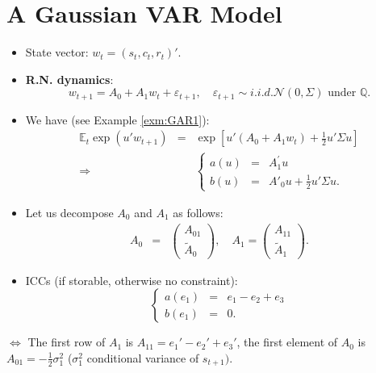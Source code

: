 \documentclass[
  12pt,
]{book}
\theoremstyle{definition}
\theoremstyle{definition}
\theoremstyle{definition}
\theoremstyle{definition}
\theoremstyle{remark}
\begin{document}
\hypertarget{FCFPGaussian}{%
\section{A Gaussian VAR Model}\label{FCFPGaussian}}

\begin{itemize}
\item
  State vector: \(w_t = (s_t, c_t, r_t)'\).
\item
  \textbf{R.N. dynamics}:
  \[
  w_{t+1} = A_0 + A_1 w_t + \varepsilon_{t+1}, \quad \varepsilon_{t+1} \sim  i.i.d. \mathcal{N}(0,\Sigma) \mbox{ under }\mathbb{Q}.
  \]
\item
  We have (see Example \ref{exm:GAR1}):
  \begin{eqnarray*}
  \mathbb{E}_t \exp (u' w_{t+1}) &=& \exp \left[u' (A_0 + A_1 w_t) + \frac{1}{2} u' \Sigma u\right] \\
  \Rightarrow &&
  \left\{
  \begin{array}{ccl}
  a(u) &=&A^{'}_1 u \\
  b(u) & =& A'_0 u + \frac{1}{2} u' \Sigma u. \end{array} \right.
  \end{eqnarray*}
\item
  Let us decompose \(A_0\) and \(A_1\) as follows:
  \begin{eqnarray*}
  A_0 &=& \left(
  \begin{array}{c} A_{01} \\ \tilde{A}_0
  \end{array}
  \right), \quad A_1 = \left(
  \begin{array}{c} A_{11} \\
  \tilde{A}_1
  \end{array}
  \right).
  \end{eqnarray*}
\item
  ICCs (if storable, otherwise no constraint):
  \[
  \left\{
  \begin{array}{ccl}
  a (e_1) & = & e_1 - e_2 + e_3 \\
  b (e_1) &=& 0. \end{array}
  \right.
  \]
\end{itemize}

\(\Leftrightarrow\) The first row of \(A_1\) is \(A_{11} = e_1'- e_2' + e_3'\), the first element of \(A_0\) is \(A_{01} = -\frac{1}{2}\sigma^2_1\) (\(\sigma^2_1\) conditional variance of \(s_{t+1})\).
\end{document}
